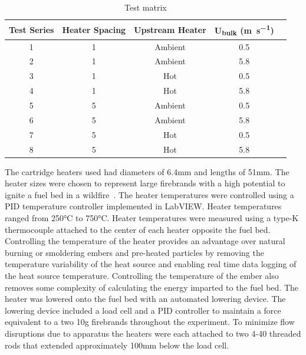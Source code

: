         \begin{table}[hpbt]
            \normalsize
            \caption{Test matrix}
            \centering
            \begin{tabular}{ccccr}
                \rowcolor{gray!50}
               Test Series & Heater Spacing & Upstream Heater & U\textsubscript{bulk} (\si{\meter\per\second})\\
                \hline
                1   & 1 & Ambient & 0.5 \\
                2   & 1 & Ambient & 5.8 \\
                3   & 1 & Hot     & 0.5 \\
                4   & 1 & Hot     & 5.8 \\
                5   & 5 & Ambient & 0.5 \\
                6   & 5 & Ambient & 5.8 \\
                7   & 5 & Hot     & 0.5 \\
                8   & 5 & Hot     & 5.8 \\
            \end{tabular}
            \label{tab:multiHeaterConfig}
        \end{table}
    
    The cartridge heaters used had diameters of 6.4\si{\milli\meter} and lengths of 51\si{\milli\meter}. The heater sizes were chosen to represent large firebrands with a high potential to ignite a fuel bed in a wildfire~\cite{Manzello2007}. The heater temperatures were controlled using a PID temperature controller implemented in LabVIEW. Heater temperatures ranged from 250\si{\celsius} to 750\si{\celsius}. Heater temperatures were measured using a type-K thermocouple attached to the center of each heater opposite the fuel bed.
    Controlling the temperature of the heater provides an advantage over natural burning or smoldering embers and pre-heated particles by removing the temperature variability of the heat source and enabling real time data logging of the heat source temperature. Controlling the temperature of the ember also removes some complexity of calculating the energy imparted to the fuel bed. The heater was lowered onto the fuel bed with an automated lowering device. The lowering device included a load cell and a PID controller to maintain a force equivalent to a two 10\si{\gram} firebrands throughout the experiment. To minimize flow disruptions due to apparatus the heaters were each attached to two 4-40 threaded rods that extended approximately 100\si{\milli\meter} below the load cell. 
    
